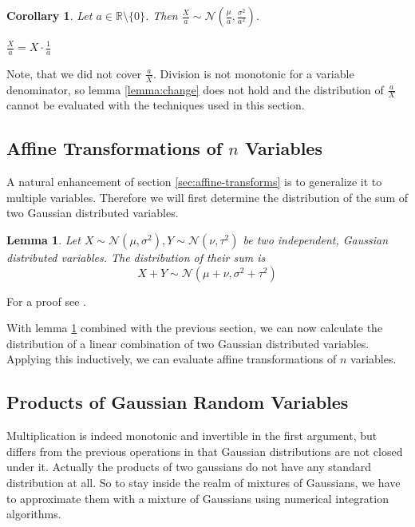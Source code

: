 \documentclass[11pt,a4paper]{book}
\newtheorem{lemma}{Lemma}
\newtheorem*{corollary}{Corollary}
\begin{document}
\begin{corollary}
  Let $a \in \mathbb{R} \setminus \{ 0 \}$. Then
  $\frac{X}{a} \sim \mathcal{N}\left( \frac{\mu}{a}, \frac{\sigma^{2}}{a^{2}}
  \right)$.
\end{corollary}
\begin{proof2}
  $\frac{X}{a} = X \cdot \frac{1}{a}$
\end{proof2}

Note, that we did not cover $\frac{a}{X}$. Division is not monotonic for a
variable denominator, so lemma \ref{lemma:change} does not hold and the
distribution of $\frac{a}{X}$ cannot be evaluated with the techniques used in
this section.

\subsection{Affine Transformations of $n$ Variables}

A natural enhancement of section \ref{sec:affine-transforms} is to generalize it
to multiple variables. Therefore we will first determine the distribution of the
sum of two Gaussian distributed variables.

\begin{lemma}
  \label{lemma:gaussian-sum}
  Let $X \sim \mathcal{N}(\mu, \sigma^{2}), Y \sim \mathcal{N}(\nu, \tau^{2})$
  be two independent, Gaussian distributed variables. The distribution of their
  sum is
  \begin{equation*}
    X + Y \sim \mathcal{N}(\mu + \nu, \sigma^{2} + \tau^{2})
  \end{equation*}
\end{lemma}
\begin{proof2}
  For a proof see \cite[Satz~11.9]{krengel}.
\end{proof2}

With lemma \ref{lemma:gaussian-sum} combined with the previous section, we can
now calculate the distribution of a linear combination of two Gaussian
distributed variables. Applying this inductively, we can evaluate affine
transformations of $n$ variables.

\subsection{Products of Gaussian Random Variables}

Multiplication is indeed monotonic and invertible in the first argument, but
differs from the previous operations in that Gaussian distributions are not
closed under it. Actually the products of two gaussians do not have any standard
distribution at all. So to stay inside the realm of mixtures of Gaussians, we
have to approximate them with a mixture of Gaussians using numerical integration
algorithms.
\end{document}
